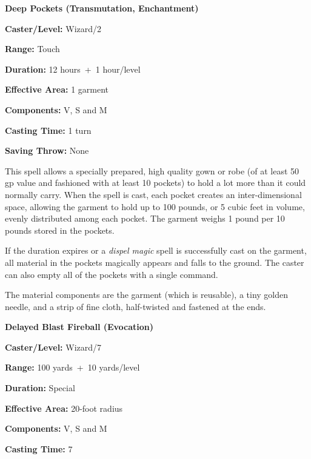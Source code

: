 \begin{multicols}{2}
\noindent
\begin{minipage}{\columnwidth}

\noindent \textbf{Deep Pockets (Transmutation, Enchantment)}

\noindent \textbf{Caster/Level:} Wizard/2

\noindent \textbf{Range:} Touch

\noindent \textbf{Duration:} 12 hours~+~1 hour/level

\noindent \textbf{Effective Area:} 1 garment

\noindent \textbf{Components:} V, S and M

\noindent \textbf{Casting Time:} 1 turn

\noindent \textbf{Saving Throw:} None

\end{minipage}

This spell allows a specially prepared, high quality gown or robe (of at least 50 gp value and fashioned with at least 10 pockets) to hold a lot more than it could normally carry.  When the spell is cast, each pocket creates an inter-dimensional space, allowing the garment to hold up to 100 pounds, or 5 cubic feet in volume, evenly distributed among each pocket.  The garment weighs 1 pound per 10 pounds stored in the pockets.

If the duration expires or a \textit{dispel magic} spell is successfully cast on the garment, all material in the pockets magically appears and falls to the ground.  The caster can also empty all of the pockets with a single command.

The material components are the garment (which is reusable), a tiny golden needle, and a strip of fine cloth, half-twisted and fastened at the ends.

\vspace{1em}

\noindent
\begin{minipage}{\columnwidth}

\noindent \textbf{Delayed Blast Fireball (Evocation)}

\noindent \textbf{Caster/Level:} Wizard/7

\noindent \textbf{Range:} 100 yards~+~10 yards/level

\noindent \textbf{Duration:} Special

\noindent \textbf{Effective Area:} 20-foot radius

\noindent \textbf{Components:} V, S and M

\noindent \textbf{Casting Time:} 7


\end{minipage}
\end{multicols}
